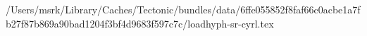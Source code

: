 /Users/msrk/Library/Caches/Tectonic/bundles/data/6ffe055852f8faf66c0acbe1a7fb27f87b869a90bad1204f3bf4d9683f597c7c/loadhyph-sr-cyrl.tex